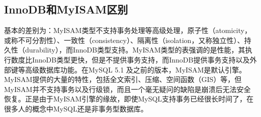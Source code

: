 \documentclass[../../../interview-questions.tex]{subfiles}
\begin{document}
\subsection{InnoDB和MyISAM区别}

基本的差别为：MyISAM类型不支持事务处理等高级处理，原子性（atomicity，或称不可分割性）、一致性（consistency）、隔离性（isolation，又称独立性）、持久性（durability），而InnoDB类型支持。MyISAM类型的表强调的是性能，其执行数度比InnoDB类型更快，但是不提供事务支持，而InnoDB提供事务支持以及外部键等高级数据库功能。在MySQL 5.1 及之前的版本，MyISAM是默认引擎。MyISAM提供的大量的特性，包括全文索引、压缩、空间函数（GIS）等，但MyISAM并不支持事务以及行级锁，而且一个毫无疑问的缺陷是崩溃后无法安全恢复。正是由于MyISAM引擎的缘故，即使MySQL支持事务已经很长时间了，在很多人的概念中MySQL还是非事务型数据库。
\end{document}
